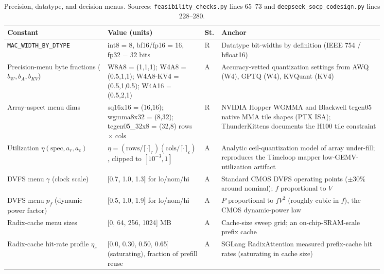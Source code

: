 \begin{table}[h]
\centering
\footnotesize
\begin{tabular}{@{}p{0.26\linewidth}p{0.17\linewidth}p{0.045\linewidth}p{0.42\linewidth}@{}}
\toprule
Constant & Value (units) & St. & Anchor \\
\midrule
\texttt{MAC\_WIDTH\_BY\_DTYPE} & int8 = 8, bf16/fp16 = 16, fp32 = 32 bits & R & Datatype bit-widths by definition (IEEE 754 / bfloat16) \\
Precision-menu byte fractions ($b_W, b_A, b_{KV}$) & W8A8 = (1,1,1); W4A8 = (0.5,1,1); W4A8-KV4 = (0.5,1,0.5); W4A16 = (0.5,2,1) & A & Accuracy-vetted quantization settings from AWQ (W4), GPTQ (W4), KVQuant (KV4) \citep{lin2024awq, frantar2023gptq, hooper2024kvquant} \\
Array-aspect menu dims & sq16x16 = (16,16); wgmma8x32 = (8,32); tcgen05\_32x8 = (32,8) rows $\times$ cols & R & NVIDIA Hopper WGMMA and Blackwell tcgen05 native MMA tile shapes (PTX ISA); ThunderKittens documents the H100 tile constraint \citep{spector2024thunderkittens} \\
Utilization $\eta(\mathrm{spec}, a_r, a_c)$ & $\eta = (\mathrm{rows}/\lceil\cdot\rceil_r)(\mathrm{cols}/\lceil\cdot\rceil_c)$, clipped to $[10^{-3}, 1]$ & A & Analytic ceil-quantization model of array under-fill; reproduces the Timeloop mapper low-GEMV-utilization artifact \citep{timeloop} \\
DVFS menu $\gamma$ (clock scale) & [0.7, 1.0, 1.3] for lo/nom/hi & A & Standard CMOS DVFS operating points ($\pm$30\% around nominal); $f$ proportional to $V$ \\
DVFS menu $p_f$ (dynamic-power factor) & [0.5, 1.0, 1.9] for lo/nom/hi & A & $P$ proportional to $f V^2$ (roughly cubic in $f$), the CMOS dynamic-power law \\
Radix-cache menu sizes & [0, 64, 256, 1024] MB & A & Cache-size sweep grid; an on-chip-SRAM-scale prefix cache \citep{zheng2024sglang} \\
Radix-cache hit-rate profile $\eta_s$ & [0.0, 0.30, 0.50, 0.65] (saturating), fraction of prefill reuse & A & SGLang RadixAttention measured prefix-cache hit rates (saturating in cache size) \citep{zheng2024sglang} \\
\bottomrule
\end{tabular}
\caption{Precision, datatype, and decision menus. Sources: \texttt{feasibility\_checks.py} lines 65--73 and \texttt{deepseek\_socp\_codesign.py} lines 228--280.}
\label{tab:coeff_menus}
\end{table}

